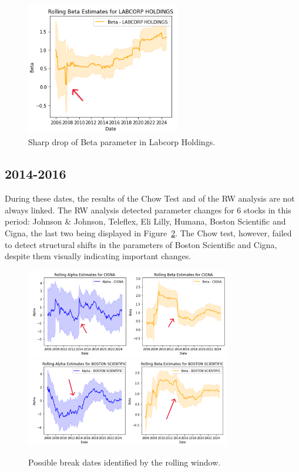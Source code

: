 \begin{figure}[h!]
    \centering
    \includegraphics[width=0.6\textwidth]{images/arrow1.png}
    \caption{Sharp drop of Beta parameter in Labcorp Holdings.}\label{fig:arrow1}
\end{figure}

\subsection{2014-2016}

During these dates, the results of the Chow Test and of the RW analysis are not always linked. 
The RW analysis detected parameter changes for 6 stocks in this period: Johnson \& Johnson, Teleflex, Eli Lilly, Humana,
Boston Scientific and Cigna, the last two being displayed in Figure~\ref{fig:arrow2}.
The Chow test, however, failed to detect structural shifts in the parameters of Boston Scientific and Cigna, despite them 
visually indicating important changes.

\begin{figure}[h!]
    \centering
    \includegraphics[width=0.8\textwidth]{images/arrow2.png}
    \includegraphics[width=0.8\textwidth]{images/arrow3.png}
    \caption{Possible break dates identified by the rolling window.}\label{fig:arrow2}
\end{figure}

